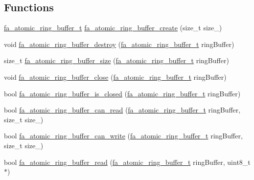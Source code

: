 \subsection*{Functions}
\begin{DoxyCompactItemize}
\item 
\hyperlink{group___fa_atomic_ring_buffer_ga3482421740e66f489d94407a0d48a2d0}{fa\-\_\-atomic\-\_\-ring\-\_\-buffer\-\_\-t} \hyperlink{group___fa_atomic_ring_buffer_ga6abb04c5ec0718605e4e24927047d4c7}{fa\-\_\-atomic\-\_\-ring\-\_\-buffer\-\_\-create} (size\-\_\-t size\-\_\-)
\item 
void \hyperlink{group___fa_atomic_ring_buffer_gaf49af6bcd11c9ebb4c6b8554aea829b8}{fa\-\_\-atomic\-\_\-ring\-\_\-buffer\-\_\-destroy} (\hyperlink{group___fa_atomic_ring_buffer_ga3482421740e66f489d94407a0d48a2d0}{fa\-\_\-atomic\-\_\-ring\-\_\-buffer\-\_\-t} ring\-Buffer)
\item 
size\-\_\-t \hyperlink{group___fa_atomic_ring_buffer_gae2ac670afafeff9b8150ae9649c83474}{fa\-\_\-atomic\-\_\-ring\-\_\-buffer\-\_\-size} (\hyperlink{group___fa_atomic_ring_buffer_ga3482421740e66f489d94407a0d48a2d0}{fa\-\_\-atomic\-\_\-ring\-\_\-buffer\-\_\-t} ring\-Buffer)
\item 
void \hyperlink{group___fa_atomic_ring_buffer_ga56faff64e32a993b750380571bfb8c76}{fa\-\_\-atomic\-\_\-ring\-\_\-buffer\-\_\-close} (\hyperlink{group___fa_atomic_ring_buffer_ga3482421740e66f489d94407a0d48a2d0}{fa\-\_\-atomic\-\_\-ring\-\_\-buffer\-\_\-t} ring\-Buffer)
\item 
bool \hyperlink{group___fa_atomic_ring_buffer_ga4fc04706251e284c9701b6ad95abf377}{fa\-\_\-atomic\-\_\-ring\-\_\-buffer\-\_\-is\-\_\-closed} (\hyperlink{group___fa_atomic_ring_buffer_ga3482421740e66f489d94407a0d48a2d0}{fa\-\_\-atomic\-\_\-ring\-\_\-buffer\-\_\-t} ring\-Buffer)
\item 
bool \hyperlink{group___fa_atomic_ring_buffer_gace79351690263650a000919845b2ca62}{fa\-\_\-atomic\-\_\-ring\-\_\-buffer\-\_\-can\-\_\-read} (\hyperlink{group___fa_atomic_ring_buffer_ga3482421740e66f489d94407a0d48a2d0}{fa\-\_\-atomic\-\_\-ring\-\_\-buffer\-\_\-t} ring\-Buffer, size\-\_\-t size\-\_\-)
\item 
bool \hyperlink{group___fa_atomic_ring_buffer_ga974e7b9a3dfb32ce44c58fbf6a25dc4f}{fa\-\_\-atomic\-\_\-ring\-\_\-buffer\-\_\-can\-\_\-write} (\hyperlink{group___fa_atomic_ring_buffer_ga3482421740e66f489d94407a0d48a2d0}{fa\-\_\-atomic\-\_\-ring\-\_\-buffer\-\_\-t} ring\-Buffer, size\-\_\-t size\-\_\-)
\item 
bool \hyperlink{group___fa_atomic_ring_buffer_ga0441ea58fc6c6ceeafc94a1e2bea972c}{fa\-\_\-atomic\-\_\-ring\-\_\-buffer\-\_\-read} (\hyperlink{group___fa_atomic_ring_buffer_ga3482421740e66f489d94407a0d48a2d0}{fa\-\_\-atomic\-\_\-ring\-\_\-buffer\-\_\-t} ring\-Buffer, uint8\-\_\-t $\ast$)

\end{DoxyCompactItemize}
